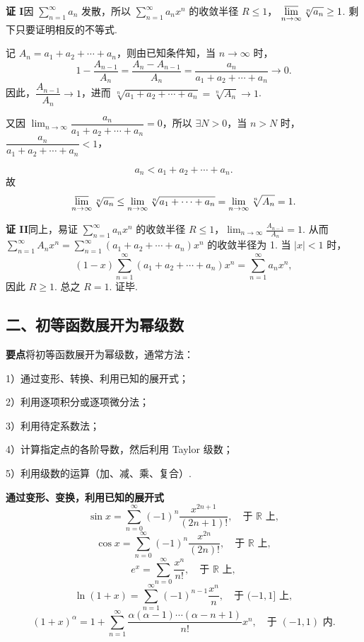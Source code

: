\documentclass[UTF8, 12pt, fontset=fandol, oneside]{ctexart}
\begin{document}
\noindent\textbf{证 I}\quad 因 $\displaystyle\sum_{n=1}^{\infty}a_n$ 发散，所以
$\displaystyle\sum_{n=1}^{\infty}a_nx^n$ 的收敛半径 $R\le1$，
$\displaystyle\varlimsup_{n\to\infty}\sqrt[n]{a_n}\ge1$. 剩下只要证明相反的不等式.

记 $A_n=a_1+a_2+\cdots+a_n$，则由已知条件知，当 $n\to\infty$ 时，
\[
  1-\frac{A_{n-1}}{A_n}
  =\frac{A_n-A_{n-1}}{A_n}
  =\frac{a_n}{a_1+a_2+\cdots+a_n}\to0.
\]
因此，$\dfrac{A_{n-1}}{A_n}\to1$，进而
$\sqrt[n]{a_1+a_2+\cdots+a_n}=\sqrt[n]{A_n}\to1$.

又因 $\displaystyle\lim_{n\to\infty}\dfrac{a_n}{a_1+a_2+\cdots+a_n}=0$，所以 $\exists N>0$，当 $n>N$ 时，
$\dfrac{a_n}{a_1+a_2+\cdots+a_n}<1$，

\[
  a_n<a_1+a_2+\cdots+a_n.
\]
故
\[
  \varlimsup_{n\to\infty}\sqrt[n]{a_n}
  \le\lim_{n\to\infty}\sqrt[n]{a_1+\cdots+a_n}
  =\lim_{n\to\infty}\sqrt[n]{A_n}=1.
\]

\noindent\textbf{证 II}\quad 同上，易证 $\displaystyle\sum_{n=1}^{\infty}a_nx^n$ 的收敛半径
$R\le1$，$\displaystyle\lim_{n\to\infty}\frac{A_{n-1}}{A_n}=1$. 从而 $\displaystyle\sum_{n=1}^{\infty}A_nx^n=
\sum_{n=1}^{\infty}(a_1+a_2+\cdots+a_n)x^n$ 的收敛半径为 1. 当 $|x|<1$ 时，
\[
  (1-x)\sum_{n=1}^{\infty}(a_1+a_2+\cdots+a_n)x^n
  =\sum_{n=1}^{\infty}a_nx^n,
\]
因此 $R\ge1$. 总之 $R=1$. 证毕.

\subsection*{二、初等函数展开为幂级数}

\noindent\textbf{要点}\quad 将初等函数展开为幂级数，通常方法：

1）通过变形、转换、利用已知的展开式；

2）利用逐项积分或逐项微分法；

3）利用待定系数法；

4）计算指定点的各阶导数，然后利用 Taylor 级数；

5）利用级数的运算（加、减、乘、复合）.

\noindent\textbf{通过变形、变换，利用已知的展开式}
\[
  \sin x=\sum_{n=0}^{\infty}(-1)^n\frac{x^{2n+1}}{(2n+1)!},\quad\text{于 }\mathbb R\text{ 上},
\]
\[
  \cos x=\sum_{n=0}^{\infty}(-1)^n\frac{x^{2n}}{(2n)!},\quad\text{于 }\mathbb R\text{ 上},
\]
\[
  e^x=\sum_{n=0}^{\infty}\frac{x^n}{n!},\quad\text{于 }\mathbb R\text{ 上},
\]
\[
  \ln(1+x)=\sum_{n=1}^{\infty}(-1)^{n-1}\frac{x^n}{n},\quad\text{于 }(-1,1]\text{ 上},
\]
\[
  (1+x)^\alpha=1+\sum_{n=1}^{\infty}
  \frac{\alpha(\alpha-1)\cdots(\alpha-n+1)}{n!}x^n,\quad\text{于 }(-1,1)\text{ 内}.
\]
\end{document}
